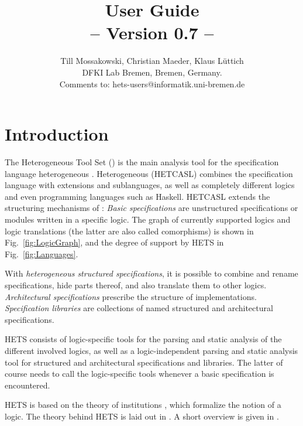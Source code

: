 \documentclass{article}
\newcommand{\normalTEXTSC}[2]{{#1\scriptsize#2}}
\newcommand{\LARGETEXTSC} [2]{{\LARGE     #1\large     #2}}
\newcommand     {\Hets}{\normalTEXTSC{H}{ETS}\xspace}
\newcommand{\LARGEHets} {\LARGETEXTSC{H}{ETS}\xspace}
\newcommand{\HetCASL}{\normalTEXTSC{H}{ET}\normalTEXTSC{C}{ASL}\xspace}
\begin{document}
\title{{\bf \protect{\LARGEHets} User Guide}\\ 
-- Version 0.7 --}
\author{Till Mossakowski, Christian Maeder, Klaus L\"{u}ttich\\[1em]
DFKI Lab Bremen, Bremen, Germany.\\[1em]
Comments to: hets-users@informatik.uni-bremen.de
}

\maketitle

\section{Introduction}


The Heterogeneous Tool Set (\protect\Hets) is the main analysis tool
for the specification language heterogeneous \CASL. Heterogeneous
\CASL (\HetCASL) combines the specification language \CASL
\cite{CASL-UM,CASL/RefManual} with \CASL extensions
and sublanguages, as well as completely different logics and even
programming languages such as Haskell. \HetCASL
extends the structuring mechanisms of \CASL:
\emph{Basic specifications} are
unstructured specifications or modules written in a specific logic.
The graph of currently supported logics and logic translations (the
latter are also called comorphisms) is shown in
Fig.~\ref{fig:LogicGraph}, and the degree of support by \Hets in
Fig.~\ref{fig:Languages}.

With \emph{heterogeneous structured specifications}, it is possible to
combine and rename specifications, hide parts thereof, and also
translate them to other logics. \emph{Architectural specifications}
prescribe the structure of implementations.  \emph{Specification
  libraries} are collections of named structured and architectural
specifications. 

\Hets consists of logic-specific tools for the parsing and static
analysis of the different involved logics, as well as a
logic-independent parsing and static analysis tool for structured and
architectural specifications and libraries. The latter of course needs
to call the logic-specific tools whenever a basic specification is
encountered.

\Hets is based on the theory of institutions \cite{GoguenBurstall92},
which formalize the notion of a logic. The theory behind \Hets is
laid out in \cite{Habil}. A short overview is given in \cite{MossakowskiEA06}.
\end{document}
